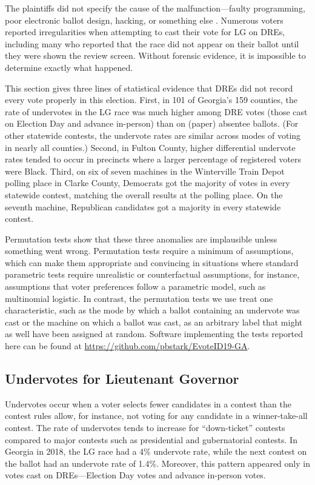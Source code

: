 \documentclass[runningheads]{llncs}
\begin{document}
The plaintiffs did not specify the cause of the malfunction---faulty programming, poor electronic ballot design, hacking, or something else \cite{coalition_crittenden_2019}.
Numerous voters reported irregularities when attempting to cast their vote for LG on DREs,
including many who reported that the race did not appear on their ballot until they were shown the review screen.
Without forensic evidence, it is impossible to determine exactly what happened.

This section gives three lines of statistical evidence that DREs did not record every vote properly in this election.
First, in 101 of Georgia's 159 counties,
the rate of undervotes in the LG race was much higher among DRE votes (those cast on Election Day and advance in-person) than on (paper) absentee ballots.
(For other statewide contests, the undervote rates are similar across modes of voting in nearly all counties.)
Second, in Fulton County, higher differential undervote rates tended to occur in precincts where a larger percentage of registered voters were Black. 
Third, on six of seven machines in the Winterville Train Depot polling place in Clarke County, Democrats got the majority of votes in every statewide contest, matching the overall results at the polling place.
On the seventh machine, Republican candidates got a majority in every statewide contest.

Permutation tests show that these three anomalies are 
implausible unless something went wrong.
Permutation tests require a minimum of assumptions, which can make them appropriate and convincing
in situations where standard parametric tests require unrealistic or counterfactual assumptions,
for instance, assumptions that voter preferences follow a parametric model, such as multinomial logistic.
In contrast, the permutation tests we use treat one characteristic, such as the mode by which a ballot containing an undervote was cast or the machine on which a ballot was cast, as an arbitrary label that might as well have been
assigned at random. 
Software implementing the tests reported here can be found at \url{https://github.com/pbstark/EvoteID19-GA}.

\subsection{Undervotes for Lieutenant Governor}
Undervotes occur when a voter selects fewer candidates in a contest than the contest rules
allow, for instance, not voting for any candidate in a winner-take-all contest.
The rate of undervotes tends to increase for ``down-ticket'' contests compared to major contests
such as presidential and gubernatorial contests.
In Georgia in 2018, the LG race had a 4\% undervote rate, while the next contest on the ballot had an undervote rate of 1.4\%.
Moreover, this pattern appeared only in votes cast on DREs---Election Day votes and advance in-person votes.
\end{document}
